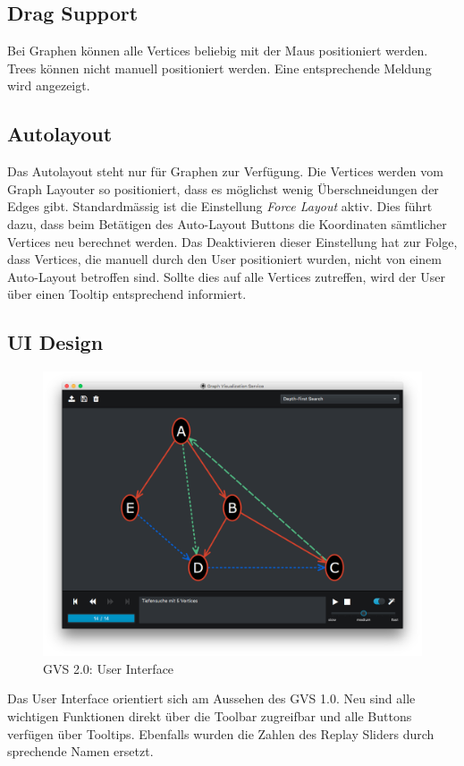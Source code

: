\documentclass[11pt,a4paper,english,oneside]{book}
\numberwithin{equation}{chapter}
\begin{document}
	\subsection{Drag Support}
	Bei Graphen können alle Vertices beliebig mit der Maus positioniert werden. Trees können nicht manuell positioniert werden. Eine entsprechende Meldung wird angezeigt.
		
	\subsection{Autolayout}
	Das Autolayout steht nur für Graphen zur Verfügung. Die Vertices werden vom Graph Layouter so positioniert, dass es möglichst wenig Überschneidungen der Edges gibt. Standardmässig ist die Einstellung \textit{Force Layout} aktiv. Dies führt dazu, dass beim Betätigen des Auto-Layout Buttons die Koordinaten sämtlicher Vertices neu berechnet werden. Das Deaktivieren dieser Einstellung hat zur Folge, dass Vertices, die manuell durch den User positioniert wurden, nicht von einem Auto-Layout betroffen sind. Sollte dies auf alle Vertices zutreffen, wird der User über einen Tooltip entsprechend informiert.
		
	\subsection{UI Design}
	\begin{figure}[h!]
		\centering
		\includegraphics[width=0.7\linewidth]{assets/images/gvs-ui-graph}
		\caption{GVS 2.0: User Interface}
		\label{fig:gvs-ui-graph}
	\end{figure}

	Das User Interface orientiert sich am Aussehen des GVS 1.0. Neu sind alle wichtigen Funktionen direkt über die Toolbar zugreifbar und alle Buttons verfügen über Tooltips. Ebenfalls wurden die Zahlen des Replay Sliders durch sprechende Namen ersetzt.
	
\end{document}
